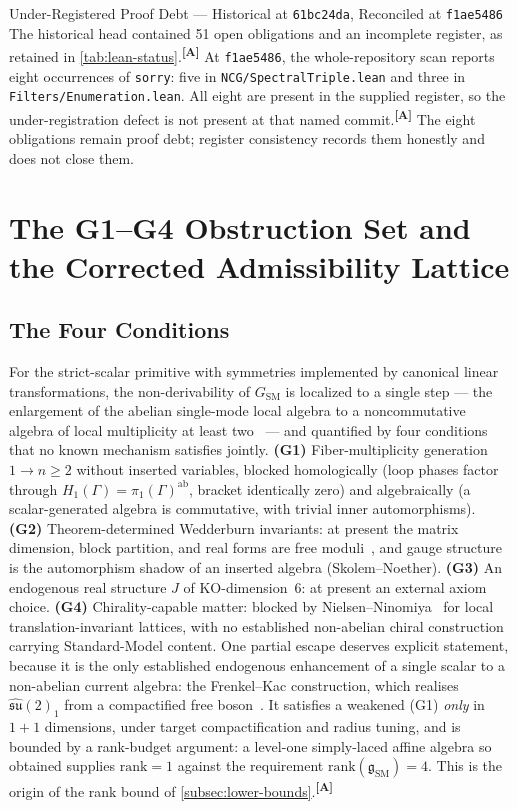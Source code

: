 \documentclass[12pt,a4paper,twoside]{article}
\theoremstyle{plain}
\theoremstyle{definition}
\theoremstyle{remark}
\newcommand{\catmark}[1]{\textsuperscript{\textsf{\textbf{[#1]}}}}
\begin{document}
\begin{probbox}{Under-Registered Proof Debt --- Historical at \texttt{61bc24da}, Reconciled at \texttt{f1ae5486}}
The historical head contained 51 open obligations and an incomplete register,
as retained in \cref{tab:lean-status}.\catmark{A}
At \texttt{f1ae5486}, the whole-repository scan reports eight occurrences of
\texttt{sorry}: five in \texttt{NCG/SpectralTriple.lean} and three in
\texttt{Filters/Enumeration.lean}. All eight are present in the supplied
register, so the under-registration defect is not present at that named
commit.\catmark{A}
The eight obligations remain proof debt; register consistency records them
honestly and does not close them.
\end{probbox}

\section{The G1--G4 Obstruction Set and the Corrected Admissibility Lattice}
\label{sec:g1g4}

\subsection{The Four Conditions}
\label{subsec:g1g4-statement}

For the strict-scalar primitive with symmetries implemented by canonical
linear transformations, the non-derivability of $G_{\mathrm{SM}}$ is
localized to a single step --- the enlargement of the abelian single-mode
local algebra to a noncommutative algebra of local multiplicity at least
two~\cite{krajewski1998,paschkesitarz1998} --- and quantified by four conditions that no known mechanism
satisfies jointly. \textbf{(G1)} Fiber-multiplicity generation
$1 \to n \geq 2$ without inserted variables, blocked homologically (loop
phases factor through $H_1(\Gamma) = \pi_1(\Gamma)^{\mathrm{ab}}$, bracket
identically zero) and algebraically (a scalar-generated algebra is
commutative, with trivial inner automorphisms). \textbf{(G2)}
Theorem-determined Wedderburn invariants: at present the matrix dimension,
block partition, and real forms are free moduli~\cite{cacic2011}, and gauge structure is
the automorphism shadow of an inserted algebra (Skolem--Noether).
\textbf{(G3)} An endogenous real structure $J$ of KO-dimension~6: at
present an external axiom choice. \textbf{(G4)} Chirality-capable matter:
blocked by Nielsen--Ninomiya~\cite{nielsen1981} for local translation-invariant lattices,
with no established non-abelian chiral construction carrying
Standard-Model content. One partial escape deserves explicit statement, because it is the only
established endogenous enhancement of a single scalar to a non-abelian
current algebra: the Frenkel--Kac construction, which realises
$\widehat{\mathfrak{su}}(2)_1$ from a compactified free
boson~\cite{frenkelkac1980,goddardolive1986}. It satisfies a weakened
(G1) \emph{only} in $1{+}1$ dimensions, under target compactification
and radius tuning, and is bounded by a rank-budget argument: a level-one
simply-laced affine algebra so obtained supplies $\mathrm{rank} = 1$
against the requirement $\mathrm{rank}(\mathfrak g_{\mathrm{SM}}) = 4$.
This is the origin of the rank bound of
\cref{subsec:lower-bounds}.\catmark{A}
\end{document}
